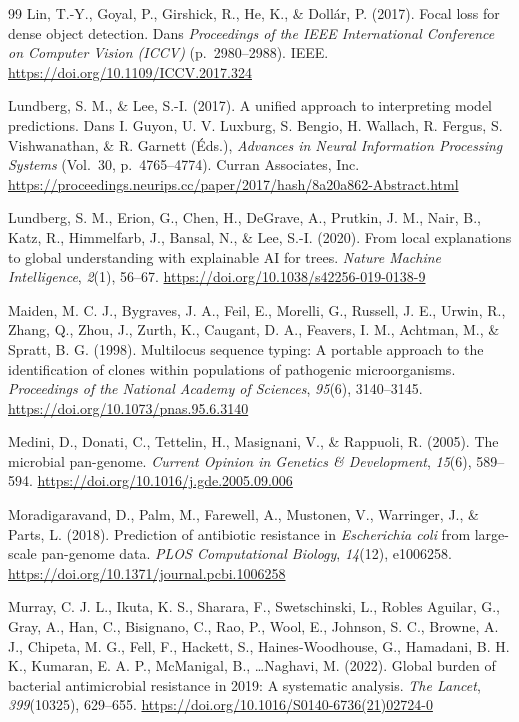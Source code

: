 \documentclass[11pt,a4paper]{article}
\begin{document}
\begin{thebibliography}{99}
Lin, T.-Y., Goyal, P., Girshick, R., He, K., \& Doll{\'a}r, P. (2017). Focal loss for dense object detection. Dans \textit{Proceedings of the IEEE International Conference on Computer Vision (ICCV)} (p.~2980--2988). IEEE. \url{https://doi.org/10.1109/ICCV.2017.324}

Lundberg, S. M., \& Lee, S.-I. (2017). A unified approach to interpreting model predictions. Dans I. Guyon, U. V. Luxburg, S. Bengio, H. Wallach, R. Fergus, S. Vishwanathan, \& R. Garnett (Éds.), \textit{Advances in Neural Information Processing Systems} (Vol.~30, p.~4765--4774). Curran Associates, Inc. \url{https://proceedings.neurips.cc/paper/2017/hash/8a20a862-Abstract.html}

Lundberg, S. M., Erion, G., Chen, H., DeGrave, A., Prutkin, J. M., Nair, B., Katz, R., Himmelfarb, J., Bansal, N., \& Lee, S.-I. (2020). From local explanations to global understanding with explainable AI for trees. \textit{Nature Machine Intelligence}, \textit{2}(1), 56--67. \url{https://doi.org/10.1038/s42256-019-0138-9}

Maiden, M. C. J., Bygraves, J. A., Feil, E., Morelli, G., Russell, J. E., Urwin, R., Zhang, Q., Zhou, J., Zurth, K., Caugant, D. A., Feavers, I. M., Achtman, M., \& Spratt, B. G. (1998). Multilocus sequence typing: A portable approach to the identification of clones within populations of pathogenic microorganisms. \textit{Proceedings of the National Academy of Sciences}, \textit{95}(6), 3140--3145. \url{https://doi.org/10.1073/pnas.95.6.3140}

Medini, D., Donati, C., Tettelin, H., Masignani, V., \& Rappuoli, R. (2005). The microbial pan-genome. \textit{Current Opinion in Genetics \& Development}, \textit{15}(6), 589--594. \url{https://doi.org/10.1016/j.gde.2005.09.006}

Moradigaravand, D., Palm, M., Farewell, A., Mustonen, V., Warringer, J., \& Parts, L. (2018). Prediction of antibiotic resistance in \textit{Escherichia coli} from large-scale pan-genome data. \textit{PLOS Computational Biology}, \textit{14}(12), e1006258. \url{https://doi.org/10.1371/journal.pcbi.1006258}

Murray, C. J. L., Ikuta, K. S., Sharara, F., Swetschinski, L., Robles Aguilar, G., Gray, A., Han, C., Bisignano, C., Rao, P., Wool, E., Johnson, S. C., Browne, A. J., Chipeta, M. G., Fell, F., Hackett, S., Haines-Woodhouse, G., Hamadani, B. H. K., Kumaran, E. A. P., McManigal, B., \dots Naghavi, M. (2022). Global burden of bacterial antimicrobial resistance in 2019: A systematic analysis. \textit{The Lancet}, \textit{399}(10325), 629--655. \url{https://doi.org/10.1016/S0140-6736(21)02724-0}


\end{thebibliography}
\end{document}
